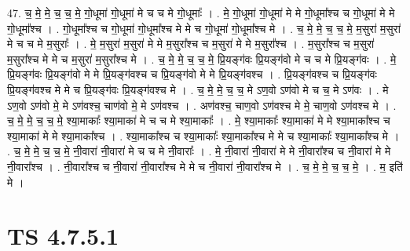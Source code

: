 \documentclass[17pt]{extarticle}
\begin{document}
47. च॒ मे॒ मे॒ च॒ च॒ मे॒ गो॒धूमा॑ गो॒धूमा॑ मे च च मे गो॒धूमाः᳚ । . मे॒ गो॒धूमा॑ गो॒धूमा॑ मे मे गो॒धूमा᳚श्च च गो॒धूमा॑ मे मे गो॒धूमा᳚श्च । . गो॒धूमा᳚श्च च गो॒धूमा॑ गो॒धूमा᳚श्च मे मे च गो॒धूमा॑ गो॒धूमा᳚श्च मे । . च॒ मे॒ मे॒ च॒ च॒ मे॒ म॒सुरा॑ म॒सुरा॑ मे च च मे म॒सुराः᳚ । . मे॒ म॒सुरा॑ म॒सुरा॑ मे मे म॒सुरा᳚श्च च म॒सुरा॑ मे मे म॒सुरा᳚श्च । . म॒सुरा᳚श्च च म॒सुरा॑ म॒सुरा᳚श्च मे मे च म॒सुरा॑ म॒सुरा᳚श्च मे । . च॒ मे॒ मे॒ च॒ च॒ मे॒ प्रि॒यङ्ग॑वः प्रि॒यङ्ग॑वो मे च च मे प्रि॒यङ्ग॑वः । . मे॒ प्रि॒यङ्ग॑वः प्रि॒यङ्ग॑वो मे मे प्रि॒यङ्ग॑वश्च च प्रि॒यङ्ग॑वो मे मे प्रि॒यङ्ग॑वश्च । . प्रि॒यङ्ग॑वश्च च प्रि॒यङ्ग॑वः प्रि॒यङ्ग॑वश्च मे मे च प्रि॒यङ्ग॑वः प्रि॒यङ्ग॑वश्च मे । . च॒ मे॒ मे॒ च॒ च॒ मे ऽण॒वो ऽण॑वो मे च च॒ मे ऽण॑वः । . मे ऽण॒वो ऽण॑वो मे॒ मे ऽण॑वश्च॒ चाण॑वो मे॒ मे ऽण॑वश्च । . अण॑वश्च॒ चाण॒वो ऽण॑वश्च मे मे॒ चाण॒वो ऽण॑वश्च मे । . च॒ मे॒ मे॒ च॒ च॒ मे॒ श्या॒माकाः᳚ श्या॒माका॑ मे च च मे श्या॒माकाः᳚ । . मे॒ श्या॒माकाः᳚ श्या॒माका॑ मे मे श्या॒माका᳚श्च च श्या॒माका॑ मे मे श्या॒माका᳚श्च । . श्या॒माका᳚श्च च श्या॒माकाः᳚ श्या॒माका᳚श्च मे मे च श्या॒माकाः᳚ श्या॒माका᳚श्च मे । . च॒ मे॒ मे॒ च॒ च॒ मे॒ नी॒वारा॑ नी॒वारा॑ मे च च मे नी॒वाराः᳚ । . मे॒ नी॒वारा॑ नी॒वारा॑ मे मे नी॒वारा᳚श्च च नी॒वारा॑ मे मे नी॒वारा᳚श्च । . नी॒वारा᳚श्च च नी॒वारा॑ नी॒वारा᳚श्च मे मे च नी॒वारा॑ नी॒वारा᳚श्च मे । . च॒ मे॒ मे॒ च॒ च॒ मे॒ । . म॒ इति॑ मे । \newline
\pagebreak
{}

\section{ TS 4.7.5.1 }
\end{document}
